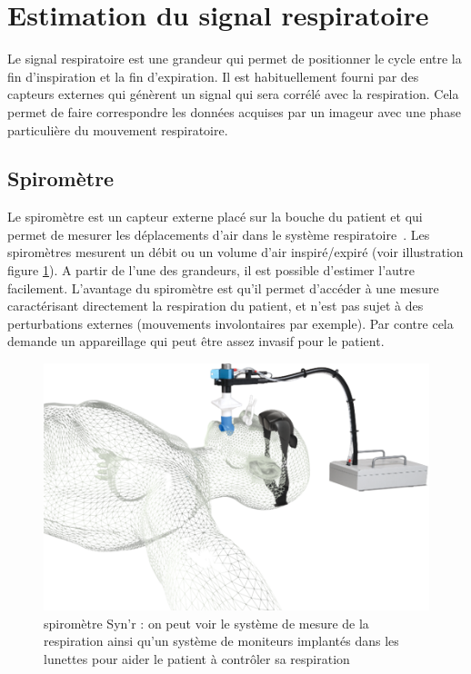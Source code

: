 \section{Estimation du signal respiratoire}

Le signal respiratoire est une grandeur qui permet de positionner le cycle entre la fin d'inspiration et la fin d'expiration. Il est habituellement fourni par des capteurs externes qui génèrent un signal qui sera corrélé avec la respiration. Cela permet de faire correspondre les données acquises par un imageur avec une phase particulière du mouvement respiratoire.

\subsection{Spiromètre}

Le spiromètre est un capteur externe placé sur la bouche du patient et qui permet de mesurer les déplacements d'air dans le système respiratoire~\cite{guivarc2004synchronization}. Les spiromètres mesurent un débit ou un volume d'air inspiré/expiré (voir illustration figure \ref{fig:spirometre}). A partir de l'une des grandeurs, il est possible d'estimer l'autre facilement. L'avantage du spiromètre est qu'il permet d'accéder à une mesure caractérisant directement la respiration du patient, et n'est pas sujet à des perturbations externes (mouvements involontaires par exemple). Par contre cela demande un appareillage qui peut être assez invasif pour le patient.

\begin{figure}[h!]
	\begin{center}
		\includegraphics[width=12cm]{images/spiro}
	\end{center}
	\caption{spiromètre Syn'r : on peut voir le système de mesure de la respiration ainsi qu'un système de moniteurs implantés dans les lunettes pour aider le patient à contrôler sa respiration} 
	\label{fig:spirometre}
\end{figure}

